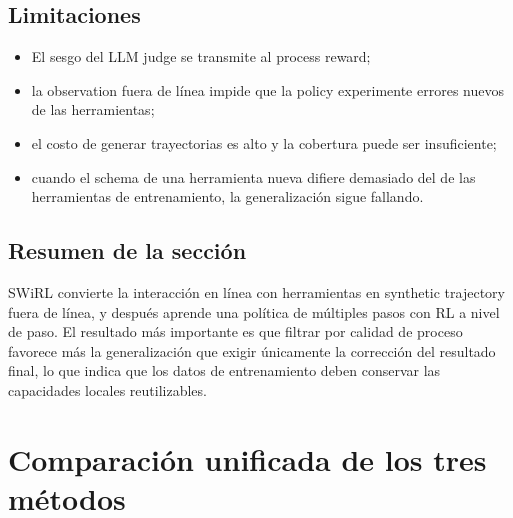 \documentclass[a4paper]{article}
\begin{document}


\subsection{Limitaciones}

\begin{itemize}
    \item El sesgo del LLM judge se transmite al process reward;
    \item la observation fuera de línea impide que la policy experimente errores nuevos de las herramientas;
    \item el costo de generar trayectorias es alto y la cobertura puede ser insuficiente;
    \item cuando el schema de una herramienta nueva difiere demasiado del de las herramientas de entrenamiento, la generalización sigue fallando.
\end{itemize}

\subsection{Resumen de la sección}

SWiRL convierte la interacción en línea con herramientas en synthetic trajectory fuera de línea, y después aprende una política de múltiples pasos con RL a nivel de paso. El resultado más importante es que filtrar por calidad de proceso favorece más la generalización que exigir únicamente la corrección del resultado final, lo que indica que los datos de entrenamiento deben conservar las capacidades locales reutilizables.
\section{Comparación unificada de los tres métodos}
\end{document}
